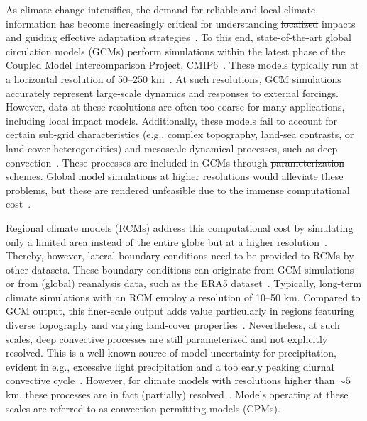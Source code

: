 \documentclass[journal abbreviation, manuscript]{copernicus}
\providecommand{\DIFadd}[1]{{\protect\color{blue}\uwave{#1}}} %
\providecommand{\DIFdel}[1]{{\protect\color{red}\sout{#1}}} %
\providecommand{\DIFaddbegin}{} %
\providecommand{\DIFaddend}{} %
\providecommand{\DIFdelbegin}{} %
\providecommand{\DIFdelend}{} %
\begin{document}


\introduction  %

As climate change intensifies, the demand for reliable and local climate information has become increasingly critical for understanding \DIFdelbegin \DIFdel{localized }\DIFdelend \DIFaddbegin \DIFadd{localised }\DIFaddend impacts and guiding effective adaptation strategies~\citep{IPCC_AR6_ch12}.
To this end, state-of-the-art global circulation models (GCMs) perform simulations within the latest phase of the Coupled Model Intercomparison Project, CMIP6~\citep{eyring_overview_2016}. 
These models typically run at a horizontal resolution of 50--250 km~\citep{nguyen_selecting_2024, IPCC_AR6_WG1_ANNEX2, IPCC_AR6_ch1}.
At such resolutions, GCM simulations accurately represent large-scale dynamics and responses to external forcings.
However, data at these resolutions are often too coarse for many applications, including local impact models.
Additionally, these models fail to account for certain sub-grid characteristics (e.g., complex topography, land-sea contrasts, or land cover heterogeneities) and mesoscale dynamical processes, such as deep convection~\citep{rummukainen_added_2016, giorgi_thirty_2019, lucas-picher_convection-permitting_2021}.
These processes are included in GCMs through \DIFdelbegin \DIFdel{parameterization }\DIFdelend \DIFaddbegin \DIFadd{parameterisation }\DIFaddend schemes.
Global model simulations at higher resolutions would alleviate these problems, but these are rendered unfeasible due to the immense computational cost~\citep{fuhrer_near-global_2018}.

Regional climate models (RCMs) address this computational cost by simulating only a limited area instead of the entire globe but at a higher resolution~\citep{giorgi_thirty_2019}.
Thereby, however, lateral boundary conditions need to be provided to RCMs by other datasets. 
These boundary conditions can originate from GCM simulations or from (global) reanalysis data, such as the ERA5 dataset~\citep{hersbach_era5_2020}.
Typically, long-term climate simulations with an RCM employ a resolution of 10--50 km.
Compared to GCM output, this finer-scale output adds value particularly in regions featuring diverse topography and varying land-cover properties~\citep{rummukainen_added_2016, IPCC_AR6_ch10}.
Nevertheless, at such scales, deep convective processes are still \DIFdelbegin \DIFdel{parameterized }\DIFdelend \DIFaddbegin \DIFadd{parameterised }\DIFaddend and not explicitly resolved. 
This is a well-known source of model uncertainty for precipitation, evident in e.g., excessive light precipitation and a too early peaking diurnal convective cycle~\citep{ban_evaluation_2014,fosser_benefit_2015, hohenegger_towards_2008, kendon_realism_2012,vergara-temprado_climate_2020}.
However, for climate models with resolutions higher than $\sim 5$ km, these processes are in fact (partially) resolved~\citep{prein_review_2015, lucas-picher_convection-permitting_2021}.
Models operating at these scales are referred to as convection-permitting models (CPMs).
\end{document}
